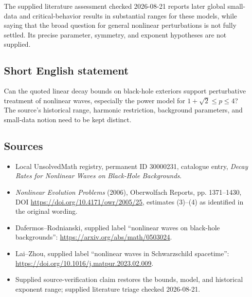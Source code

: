 \documentclass[11pt]{article}
\begin{document}
The supplied literature assessment checked 2026-08-21 reports later global small-data and critical-behavior results in substantial ranges for these models, while saying that the broad question for general nonlinear perturbations is not fully settled. Its precise parameter, symmetry, and exponent hypotheses are not supplied.
\subsection{Short English statement}
Can the quoted linear decay bounds on black-hole exteriors support perturbative treatment of nonlinear waves, especially the power model for \(1+\sqrt2\leq p\leq4\)? The source's historical range, harmonic restriction, background parameters, and small-data notion need to be kept distinct.
\subsection{Sources}
\begin{itemize}
\item Local UnsolvedMath registry, permanent ID 30000231, catalogue entry, \emph{Decay Rates for Nonlinear Waves on Black-Hole Backgrounds}.
\item \emph{Nonlinear Evolution Problems} (2006), Oberwolfach Reports, pp. 1371--1430, DOI \url{https://doi.org/10.4171/owr/2005/25}, estimates (3)--(4) as identified in the original wording.
\item Dafermos--Rodnianski, supplied label ``nonlinear waves on black-hole backgrounds'': \url{https://arxiv.org/abs/math/0503024}.
\item Lai--Zhou, supplied label ``nonlinear waves in Schwarzschild spacetime'': \url{https://doi.org/10.1016/j.matpur.2023.02.009}.
\item Supplied source-verification claim restores the bounds, model, and historical exponent range; supplied literature triage checked 2026-08-21.
\end{itemize}
\end{document}
